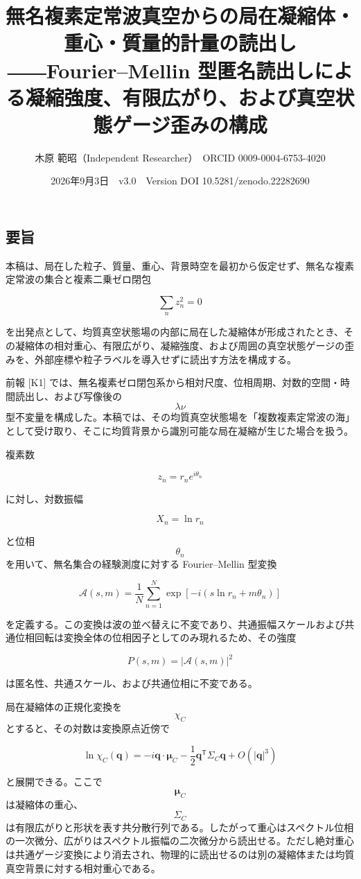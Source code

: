 \documentclass[
  a4paper,
]{ltjsarticle}
\title{無名複素定常波真空からの局在凝縮体・重心・質量的計量の読出し
――Fourier--Mellin
型匿名読出しによる凝縮強度、有限広がり、および真空状態ゲージ歪みの構成}
\author{木原 範昭（Independent Researcher）　ORCID 0009-0004-6753-4020}
\date{2026年9月3日　v3.0　Version DOI 10.5281/zenodo.22282690}
\begin{document}
\maketitle

\subsection{要旨}\label{ux8981ux65e8}

本稿は、局在した粒子、質量、重心、背景時空を最初から仮定せず、無名な複素定常波の集合と複素二乗ゼロ閉包

\[
\sum_n z_n^2=0
\]

を出発点として、均質真空状態場の内部に局在した凝縮体が形成されたとき、その凝縮体の相対重心、有限広がり、凝縮強度、および周囲の真空状態ゲージの歪みを、外部座標や粒子ラベルを導入せずに読出す方法を構成する。

前報 {[}K1{]}
では、無名複素ゼロ閉包系から相対尺度、位相周期、対数的空間・時間読出し、および写像後の
\[\lambda\nu\]
型不変量を構成した。本稿では、その均質真空状態場を「複数複素定常波の海」として受け取り、そこに均質背景から識別可能な局在凝縮が生じた場合を扱う。

複素数

\[
z_n=r_n e^{i\theta_n}
\]

に対し、対数振幅

\[
X_n=\ln r_n
\]

と位相 \[\theta_n\] を用いて、無名集合の経験測度に対する Fourier--Mellin
型変換

\[
\mathcal A(s,m)
=
\frac{1}{N}
\sum_{n=1}^{N}
\exp\left[
-i\left(
s\ln r_n+m\theta_n
\right)
\right]
\]

を定義する。この変換は波の並べ替えに不変であり、共通振幅スケールおよび共通位相回転は変換全体の位相因子としてのみ現れるため、その強度

\[
P(s,m)=|\mathcal A(s,m)|^2
\]

は匿名性、共通スケール、および共通位相に不変である。

局在凝縮体の正規化変換を \[\chi_C\] とすると、その対数は変換原点近傍で

\[
\ln\chi_C(\mathbf q)
=
-i\mathbf q\cdot\boldsymbol\mu_C
-\frac12
\mathbf q^{\mathsf T}\Sigma_C\mathbf q
+O(|\mathbf q|^3)
\]

と展開できる。ここで \[\boldsymbol\mu_C\] は凝縮体の重心、\[\Sigma_C\]
は有限広がりと形状を表す共分散行列である。したがって重心はスペクトル位相の一次微分、広がりはスペクトル振幅の二次微分から読出せる。ただし絶対重心は共通ゲージ変換により消去され、物理的に読出せるのは別の凝縮体または均質真空背景に対する相対重心である。
\end{document}

